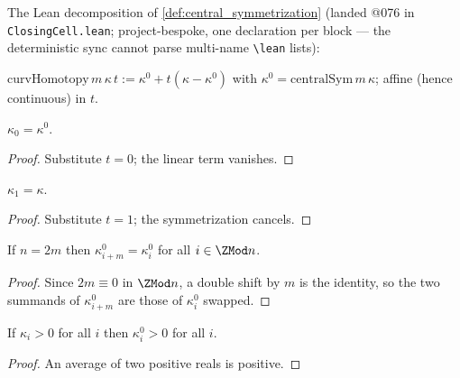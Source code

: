 The Lean decomposition of \cref{def:central_symmetrization} (landed @076 in
\texttt{ClosingCell.lean}; project-bespoke, one declaration per block --- the
deterministic sync cannot parse multi-name \texttt{\textbackslash lean} lists):

\begin{definition}
  \label{def:curv_homotopy}
  $\mathrm{curvHomotopy}\,m\,\kappa\,t := \kappa^0 + t(\kappa - \kappa^0)$ with
  $\kappa^0 = \mathrm{centralSym}\,m\,\kappa$; affine (hence continuous) in $t$.
\end{definition}

\begin{lemma}\leanok
[homotopy endpoint $t=0$]
  \label{lem:curv_homotopy_zero}
  $\kappa_0 = \kappa^0$.
\end{lemma}
\begin{proof}

\leanok
  Substitute $t = 0$; the linear term vanishes.
\end{proof}

\begin{lemma}\leanok
[homotopy endpoint $t=1$]
  \label{lem:curv_homotopy_one}
  $\kappa_1 = \kappa$.
\end{lemma}
\begin{proof}

\leanok
  Substitute $t = 1$; the symmetrization cancels.
\end{proof}

\begin{lemma}
  \label{lem:central_sym_symm}
  If $n = 2m$ then $\kappa^0_{i+m} = \kappa^0_i$ for all $i \in \ZMod n$.
\end{lemma}
\begin{proof}

\leanok
  Since $2m \equiv 0$ in $\ZMod n$, a double shift by $m$ is the identity, so
  the two summands of $\kappa^0_{i+m}$ are those of $\kappa^0_i$ swapped.
\end{proof}

\begin{lemma}
  \label{lem:central_sym_pos}
  If $\kappa_i > 0$ for all $i$ then $\kappa^0_i > 0$ for all $i$.
\end{lemma}
\begin{proof}

\leanok
  An average of two positive reals is positive.
\end{proof}

